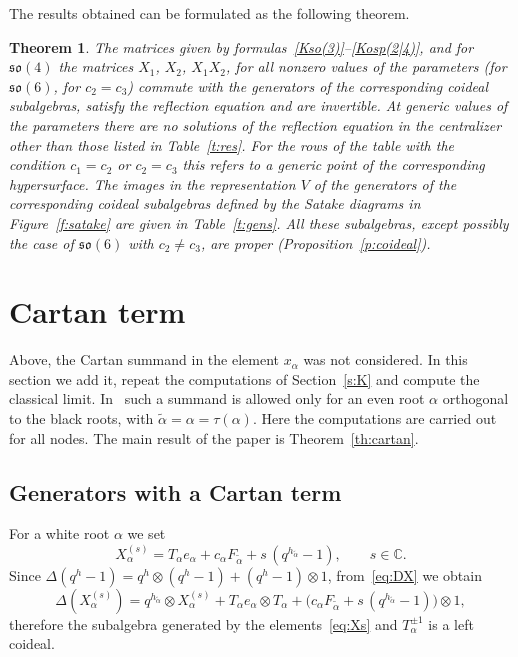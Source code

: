 \documentclass[12pt,a4paper]{article}
\newtheorem{theorem}{Theorem}
\newcommand{\so}{\mathfrak{so}}
\newcommand{\ta}{\tilde\alpha}
\newcommand{\ot}{\otimes}
\begin{document}
The results obtained can be formulated as the following theorem.

\begin{theorem}\label{th:main}
The matrices given by formulas~\eqref{Kso(3)}--\eqref{Kosp(2|4)}, and for $\so(4)$ the matrices $X_1$, $X_2$, $X_1X_2$, for all nonzero values of the parameters (for $\so(6)$, for $c_2=c_3$) commute with the generators of the corresponding coideal subalgebras, satisfy the reflection equation and are invertible. At generic values of the parameters there are no solutions of the reflection equation in the centralizer other than those listed in Table~\ref{t:res}. For the rows of the table with the condition $c_1=c_2$ or $c_2=c_3$ this refers to a generic point of the corresponding hypersurface. The images in the representation $V$ of the generators of the corresponding coideal subalgebras defined by the Satake diagrams in Figure~\ref{f:satake} are given in Table~\ref{t:gens}. All these subalgebras, except possibly the case of $\so(6)$ with $c_2\neq c_3$, are proper (Proposition~\ref{p:coideal}).
\end{theorem}





\section{Cartan term}\label{s:cartan}
Above, the Cartan summand %
in the element $x_\alpha$ was not considered. In this section we add it, repeat
the computations of Section~\ref{s:K} and compute the classical limit. In~\cite[Section~4]{AMS} such a summand is allowed only for an even root $\alpha$ orthogonal to the black
roots, with $\ta=\alpha=\tau(\alpha)$. Here the computations are carried out for all nodes. The main result of the paper is
Theorem~\ref{th:cartan}.


\subsection{Generators with a Cartan term}\label{ss:Xs}
For a white root $\alpha$ we set
\begin{equation}\label{eq:Xs}
X^{(s)}_\alpha=T_\alpha e_\alpha+c_\alpha F_{\ta}+s\,(q^{h_{\ta}}-1),\qquad s\in\mathbb C .
\end{equation}
Since $\Delta(q^{h}-1)=q^{h}\ot(q^{h}-1)+(q^{h}-1)\ot1$, from~\eqref{eq:DX} we obtain
\[
\Delta(X^{(s)}_\alpha)=q^{h_{\ta}}\ot X^{(s)}_\alpha+T_\alpha e_\alpha\ot T_\alpha
+\bigl(c_\alpha F_{\ta}+s\,(q^{h_{\ta}}-1)\bigr)\ot1 ,
\]
therefore the subalgebra generated by the elements~\eqref{eq:Xs} and $T_\alpha^{\pm1}$ is a left coideal.
\end{document}
